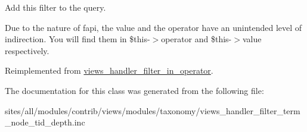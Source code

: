 Add this filter to the query.

Due to the nature of fapi, the value and the operator have an unintended level of indirection. You will find them in \$this-$>$operator and \$this-$>$value respectively. 

Reimplemented from \hyperlink{classviews__handler__filter__in__operator_f4b9a596ad1e6fbee116977ca0a7d8a9}{views\_\-handler\_\-filter\_\-in\_\-operator}.

The documentation for this class was generated from the following file:\begin{CompactItemize}
\item 
sites/all/modules/contrib/views/modules/taxonomy/views\_\-handler\_\-filter\_\-term\_\-node\_\-tid\_\-depth.inc\end{CompactItemize}

